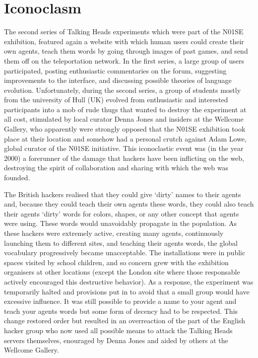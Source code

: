 \section{Iconoclasm} 

The second series of Talking Heads experiments which were part of the N01SE exhibition,
featured again a website with which human users could create their own 
agents, teach them words by going through images of past games, and send them off on the teleportation network.
In the first series, a
large group of users participated, posting enthusiastic commentaries on the forum, suggesting improvements 
to the interface, and discussing possible theories of language evolution. Unfortunately, during the second 
series, a group of students mostly from the university of Hull (UK) evolved from enthusiastic and interested 
participants into a mob of rude thugs that wanted to destroy the experiment at all cost, stimulated by 
local curator Denna Jones and insiders at the Wellcome Gallery, who apparently were strongly opposed 
that the N01SE exhibition took place 
at their location and somehow had a personal crutch against Adam Lowe, global curator of the N01SE initiative. 
This iconoclastic event was (in the year 2000) a forerunner of the damage that 
hackers have been inflicting on the web, destroying the spirit of collaboration and 
sharing with which the web was founded. 

The British hackers realised that they could give `dirty' names to their agents and, because they 
could teach their own agents these words, they could also teach their agents `dirty' words for colors, 
shapes, or any other concept that agents were using. These words would unavoidably propagate in the population. 
As these hackers were extremely active, creating many agents, continuously launching them to different sites, and teaching 
their agents words, the global vocabulary progressively became unacceptable. 
The installations were in public spaces visited by school children, and so concern grew with the exhibition organisers
at other locations (except the London site where those responsable actively encouraged this destructive behavior). 
As a response, the experiment was temporarily halted and provisions put in to avoid that a small group would have 
excessive influence. It was still possible to provide a name to your agent and teach your agents words but 
some form of decency had to be respected. This change restored order but resulted in an overreaction of the part of 
the English hacker group who now used all possible means to attack the Talking Heads servers themselves, 
enouraged by Denna Jones and aided by others at the Wellcome Gallery. 

